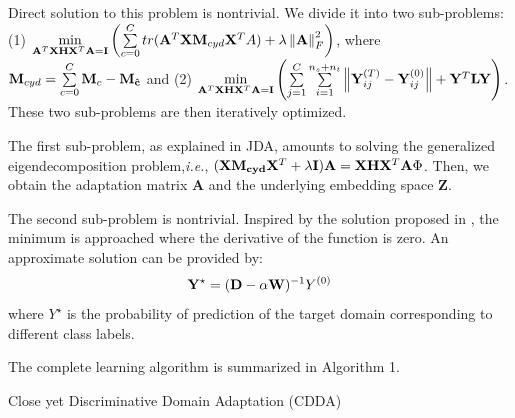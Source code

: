 \documentclass[10pt,twocolumn,letterpaper]{article}
\begin{document}
\begin{CJK*}{UTF8}{gkai}
Direct solution to this problem is nontrivial. We divide it into two sub-problems:  (1) $ \mathop {\min }\limits_{{{\bf{A}}^T}{\bf{XH}}{{\bf{X}}^T}{\bf{A}} = {\bf{I}}} \left( {\sum\limits_{c = 0}^C {tr({{\bf{A}}^T}{\bf{X}}{{\bf{M}}_{cyd}}{{\bf{X}}^T}A)}  + \lambda \left\| {\bf{A}} \right\|_F^2} \right) $, where ${{\bf{M}}_{cyd}} = \sum\limits_{c = 0}^C {{{\bf{M}}_c} - {{\bf{M}}_{{\bf{\hat c}}}}} $ and (2)  $\mathop {\min }\limits_{{{\bf{A}}^T}{\bf{XH}}{{\bf{X}}^T}{\bf{A}} = {\bf{I}}} \left( {\sum\limits_{j = 1}^C {\sum\limits_{i = 1}^{{n_s} + {n_t}} {\left\| {{\bf{Y}}_{ij}^{(T)} - {\bf{Y}}_{ij}^{(0)}} \right\|} }  + {{\bf{Y}}^T}{\bf{L}}{\bf{Y}}} \right)$. These two sub-problems are then iteratively optimized. 

The first sub-problem, as explained in  JDA, amounts to solving the generalized eigendecomposition problem,\textit{i.e.},  $({\bf{X}}{\bf{M_{cyd}}}{{\bf{X}}^T} + \lambda {\bf{I}}){\bf{A}} = {\bf{XH}}{{\bf{X}}^T}{\bf{A}}\Phi $. Then, we obtain the adaptation matrix $\boldsymbol{A}$ and the underlying embedding space $\boldsymbol{Z}$. 

The  second sub-problem is  nontrivial. Inspired by the solution proposed in   \cite{Zhou04learningwith} \cite{6341755} \cite{6619251}, the minimum is approached where the derivative of the function is zero.  An approximate solution can be provided by: 
\vspace{-5pt}
\begin{equation}\label{eq:Y_optimal}
	{{\bf{Y}}^ \star } = {({\bf{D}} - \alpha {\bf{W}})^{ - 1}}{Y^{(0)}}
\end{equation}
where  $Y^\star$ is the probability of prediction of the target domain corresponding to different class labels. 


The complete learning algorithm  is summarized in Algorithm 1.


\begin{algorithm}[!h]
	\caption{Close yet Discriminative Domain Adaptation (CDDA)}
\end{algorithm}
\end{CJK*}
\end{document}
